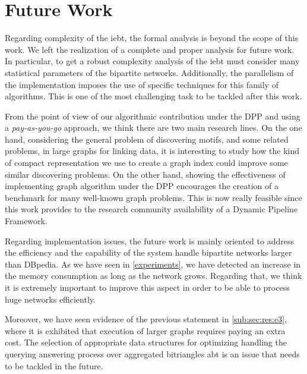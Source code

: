 \section{Future Work}

Regarding complexity of the \acrshort{iebt}, the formal analysis is beyond the scope of this work.  We left the realization of a complete  and  proper analysis for future work. In particular, to get a robust  complexity analysis of the \acrshort{iebt} must consider many statistical parameters of the bipartite networks. Additionally,  the parallelism of the implementation imposes the use of specific techniques for this family of algorithms. This is one of the most challenging task to be tackled after this work.

From the point of view of our algorithmic contribution  under the DPP and using a \textit{pay-as-you-go} approach, we think there are two main research lines. On the one hand,  considering  the general problem of discovering motifs,  and some related problems, in large graphs for linking data, it is interesting to study how the  kind of compact representation we use to create a graph index could improve some similar discovering problems. On the other hand, showing the effectiveness of implementing graph algorithm under the DPP encourages the creation of a benchmark  for many well-known graph problems. This is now really feasible since this work  provides to the research community  availability of a Dynamic Pipeline Framework. 


 Regarding implementation issues, the future work is mainly oriented to address the efficiency and the capability of the system handle bipartite networks  larger than DBpedia. As we have seen in \autoref{experiments}, we have detected an increase in the memory consumption as long as the network grows. 
Regarding that, we think it is extremely important to improve this aspect in order to be able to process huge networks efficiently. 

Moreover, we have seen evidence of the previous statement in \autoref{sub:sec:res:e3}, where it is exhibited that execution of larger graphs requires paying an extra cost.
The selection of appropriate data structures for optimizing handling the querying answering process over aggregated bitriangles  \acrlong{abt} is an issue that needs to be tackled in the future. 

